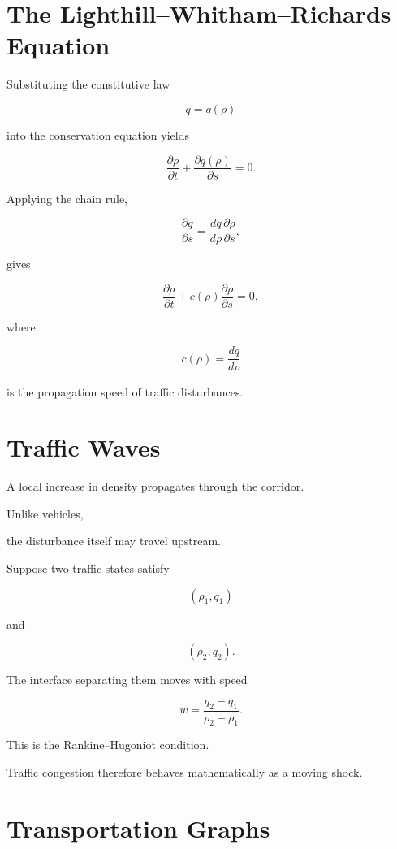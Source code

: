 \documentclass[11pt,fleqn]{book}
\numberwithin{equation}{chapter}
\theoremstyle{plain}
\theoremstyle{definition}
\theoremstyle{remark}
\begin{document}
\section{The Lighthill--Whitham--Richards Equation}

Substituting the constitutive law

\[
q=q(\rho)
\]

into the conservation equation yields

\[
\boxed{
\frac{\partial\rho}{\partial t}
+
\frac{\partial q(\rho)}{\partial s}
=
0.
}
\]

Applying the chain rule,

\[
\frac{\partial q}{\partial s}
=
\frac{dq}{d\rho}
\frac{\partial\rho}{\partial s},
\]

gives

\[
\boxed{
\frac{\partial\rho}{\partial t}
+
c(\rho)
\frac{\partial\rho}{\partial s}
=
0,
}
\]

where

\[
c(\rho)
=
\frac{dq}{d\rho}
\]

is the propagation speed of traffic disturbances.


\section{Traffic Waves}

A local increase in density propagates through the corridor.

Unlike vehicles,

the disturbance itself may travel upstream.

Suppose two traffic states satisfy

\[
(\rho_1,q_1)
\]

and

\[
(\rho_2,q_2).
\]

The interface separating them moves with speed

\[
\boxed{
w
=
\frac{q_2-q_1}
{\rho_2-\rho_1}.
}
\]

This is the Rankine--Hugoniot condition.

Traffic congestion therefore behaves mathematically as a moving shock.


\section{Transportation Graphs}
\end{document}
